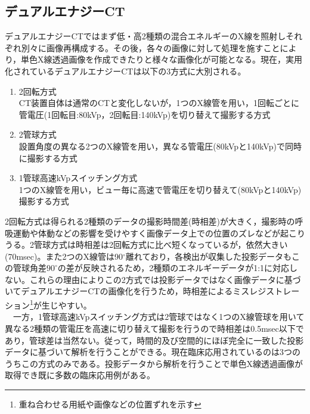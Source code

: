 \subsection{デュアルエナジーCT\label{sec:dual}}
デュアルエナジーCTではまず低・高2種類の混合エネルギーのX線を照射しそれぞれ別々に画像再構成する。その後，各々の画像に対して処理を施すことにより，単色X線透過画像を作成できたりと様々な画像化が可能となる。現在，実用化されているデュアルエナジーCTは以下の3方式に大別される\cite{GE}\cite{siemens}\cite{philips}。

\begin{enumerate}
\renewcommand{\labelenumi}{(\arabic{enumi})}
\item 2回転方式\\CT装置自体は通常のCTと変化しないが，1つのX線管を用い，1回転ごとに管電圧(1回転目:80kVp，2回転目:140kVp)を切り替えて撮影する方式
\item 2管球方式\\設置角度の異なる2つのX線管を用い，異なる管電圧(80kVpと140kVp)で同時に撮影する方式
\item 1管球高速kVpスイッチング方式\\1つのX線管を用い，ビュー毎に高速で管電圧を切り替えて(80kVpと140kVp)撮影する方式
\end{enumerate}

2回転方式は得られる2種類のデータの撮影時間差(時相差)が大きく，撮影時の呼吸運動や体動などの影響を受けやすく画像データ上での位置のズレなどが起こりうる。2管球方式は時相差は2回転方式に比べ短くなっているが，依然大きい(70msec)。また2つのX線管は90$^{\circ}$離れており，各検出が収集した投影データもこの管球角差$90^{\circ}$の差が反映されるため，2種類のエネルギーデータが1:1に対応しない。これらの理由によりこの2方式では投影データではなく画像データに基づいてデュアルエナジーCTの画像化を行うため，時相差によるミスレジストレーション\footnote{重ね合わせる用紙や画像などの位置ずれを示す}が生じやすい。\\
\ \ 一方，1管球高速kVpスイッチング方式は2管球ではなく1つのX線管球を用いて異なる2種類の管電圧を高速に切り替えて撮影を行うので時相差は0.5msec以下であり，管球差は当然ない。従って，時間的及び空間的にほぼ完全に一致した投影データに基づいて解析を行うことができる。現在臨床応用されているのは3つのうちこの方式のみである。投影データから解析を行うことで単色X線透過画像が取得でき既に多数の臨床応用例がある\cite{spectralCT}。

